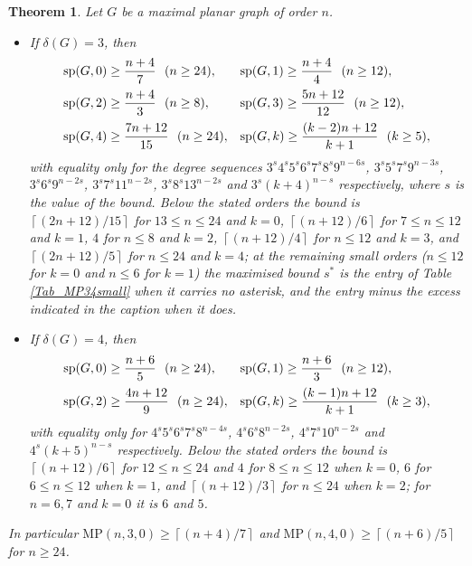 \documentclass[12pt,a4paper]{article}%
\newtheorem{theorem}{Theorem}
\begin{document}
\begin{theorem}
\label{Tm_planar34}Let $G$ be a maximal planar graph of order $n$.

\begin{itemize}
\item[\textrm{(i)}] If $\delta (G)=3$, then
\[
\begin{array}
[c]{ll}%
\mathrm{sp}(G,0)\geq \dfrac{n+4}{7}\ \ (n\geq 24), & \mathrm{sp}(G,1)\geq \dfrac{n+4}{4}\ \ (n\geq
12),\\[3mm]
\mathrm{sp}(G,2)\geq \dfrac{n+4}{3}\ \ (n\geq 8), & \mathrm{sp}(G,3)\geq \dfrac{5n+12}{12}\ \ (n\geq
12),\\[3mm]
\mathrm{sp}(G,4)\geq \dfrac{7n+12}{15}\ \ (n\geq 24), & \mathrm{sp}(G,k)\geq \dfrac{(k-2)n+12}{k+1}\
\ (k\geq 5),
\end{array}
\]
with equality only for the degree sequences $3^{s}4^{s}5^{s}6^{s}7^{s}8^{s}9^{n-6s}$,
$3^{s}5^{s}7^{s}9^{n-3s}$, $3^{s}6^{s}9^{n-2s}$, $3^{s}7^{s}11^{n-2s}$, $3^{s}8^{s}13^{n-2s}$ and
$3^{s}(k+4)^{n-s}$ respectively, where $s$ is the value of the bound. Below the stated orders the
bound is $\left\lceil (2n+12)/15\right\rceil $ for $13\leq n\leq 24$ and $k=0$,
$\left\lceil (n+12)/6\right\rceil $ for $7\leq n\leq 12$ and $k=1$, $4$ for $n\leq 8$ and $k=2$,
$\left\lceil (n+12)/4\right\rceil $ for $n\leq 12$ and $k=3$, and $\left\lceil (2n+12)/5\right\rceil $
for $n\leq 24$ and $k=4$; at the remaining small orders ($n\leq 12$ for $k=0$ and $n\leq 6$ for
$k=1$) the maximised bound $s^{\ast }$ is the entry of Table \ref{Tab_MP34small} when it carries no asterisk, and the
entry minus the excess indicated in the caption when it does.

\item[\textrm{(ii)}] If $\delta (G)=4$, then
\[
\begin{array}
[c]{ll}%
\mathrm{sp}(G,0)\geq \dfrac{n+6}{5}\ \ (n\geq 24), & \mathrm{sp}(G,1)\geq \dfrac{n+6}{3}\ \ (n\geq
12),\\[3mm]
\mathrm{sp}(G,2)\geq \dfrac{4n+12}{9}\ \ (n\geq 24), & \mathrm{sp}(G,k)\geq \dfrac{(k-1)n+12}{k+1}\ \
(k\geq 3),
\end{array}
\]
with equality only for $4^{s}5^{s}6^{s}7^{s}8^{n-4s}$, $4^{s}6^{s}8^{n-2s}$, $4^{s}7^{s}10^{n-2s}$
and $4^{s}(k+5)^{n-s}$ respectively. Below the stated orders the bound is
$\left\lceil (n+12)/6\right\rceil $ for $12\leq n\leq 24$ and $4$ for $8\leq n\leq 12$ when $k=0$,
$6$ for $6\leq n\leq 12$ when $k=1$, and $\left\lceil (n+12)/3\right\rceil $ for $n\leq 24$ when
$k=2$; for $n=6,7$ and $k=0$ it is $6$ and $5$.
\end{itemize}

In particular $\mathrm{MP}(n,3,0)\geq \left\lceil (n+4)/7\right\rceil $ and $\mathrm{MP}(n,4,0)\geq
\left\lceil (n+6)/5\right\rceil $ for $n\geq 24$.
\end{theorem}
\end{document}
